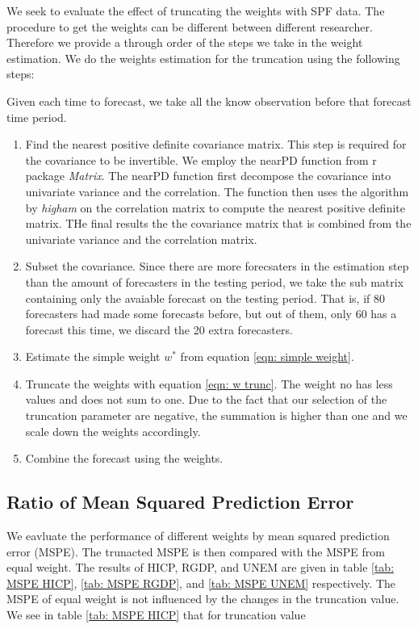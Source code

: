 \documentclass[]{article}
\begin{document}
We seek to evaluate the effect of truncating the weights with SPF data.
The procedure to get the weights can be different between different
researcher. Therefore we provide a through order of the steps we take in
the weight estimation. We do the weights estimation for the truncation
using the following steps:

Given each time to forecast, we take all the know observation before
that forecast time period.

\begin{enumerate}
\def\labelenumi{\arabic{enumi}.}
\item
  Find the nearest positive definite covariance matrix. This step is
  required for the covariance to be invertible. We employ the nearPD
  function from r package \emph{Matrix}. The nearPD function first
  decompose the covariance into univariate variance and the correlation.
  The function then uses the algorithm by \emph{higham} on the
  correlation matrix to compute the nearest positive definite matrix.
  THe final results the the covariance matrix that is combined from the
  univariate variance and the correlation matrix.
\item
  Subset the covariance. Since there are more forecsaters in the
  estimation step than the amount of forecasters in the testing period,
  we take the sub matrix containing only the avaiable forecast on the
  testing period. That is, if 80 forecasters had made some forecasts
  before, but out of them, only 60 has a forecast this time, we discard
  the 20 extra forecasters.
\item
  Estimate the simple weight \(w^*\) from equation
  \ref{eqn: simple weight}.
\item
  Truncate the weights with equation \ref{eqn: w trunc}. The weight no
  has less values and does not sum to one. Due to the fact that our
  selection of the truncation parameter are negative, the summation is
  higher than one and we scale down the weights accordingly.
\item
  Combine the forecast using the weights.
\end{enumerate}

\subsection{Ratio of Mean Squared Prediction
Error}\label{ratio-of-mean-squared-prediction-error}

We eavluate the performance of different weights by mean squared
prediction error (MSPE). The trunacted MSPE is then compared with the
MSPE from equal weight. The results of HICP, RGDP, and UNEM are given in
table \ref{tab: MSPE HICP}, \ref{tab: MSPE RGDP}, and
\ref{tab: MSPE UNEM} respectively. The MSPE of equal weight is not
influenced by the changes in the truncation value. We see in table
\ref{tab: MSPE HICP} that for truncation value
\end{document}
